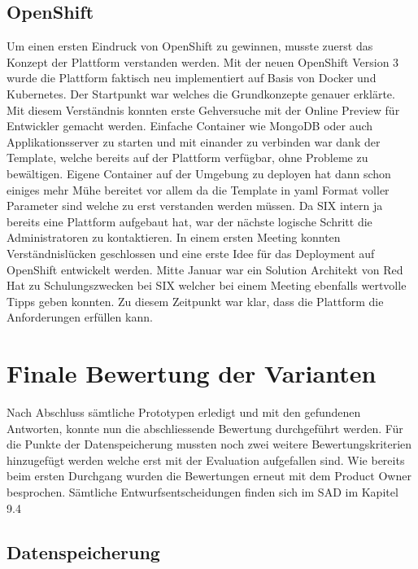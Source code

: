 \subsection{OpenShift}

Um einen ersten Eindruck von OpenShift zu gewinnen, musste zuerst das Konzept der Plattform verstanden werden. Mit der neuen OpenShift Version 3 wurde die Plattform faktisch neu implementiert auf Basis von Docker und Kubernetes. Der Startpunkt war \cite{openshiftintro} welches die Grundkonzepte genauer erklärte. Mit diesem Verständnis konnten erste Gehversuche mit der Online Preview für Entwickler gemacht werden. Einfache Container wie MongoDB oder auch Applikationsserver zu starten und mit einander zu verbinden war dank der Template, welche bereits auf der Plattform verfügbar, ohne Probleme zu bewältigen. Eigene Container auf der Umgebung zu deployen hat dann schon einiges mehr Mühe bereitet vor allem da die Template in yaml Format voller Parameter sind welche zu erst verstanden werden müssen. Da SIX intern ja bereits eine Plattform aufgebaut hat, war der nächste logische Schritt die Administratoren zu kontaktieren. In einem ersten Meeting konnten Verständnislücken geschlossen und eine erste Idee für das Deployment auf OpenShift entwickelt werden. Mitte Januar war ein Solution Architekt von Red Hat zu Schulungszwecken bei SIX welcher bei einem Meeting ebenfalls wertvolle Tipps geben konnten. Zu diesem Zeitpunkt war klar, dass die Plattform die Anforderungen erfüllen kann.
\newpage

\section{Finale Bewertung der Varianten}

Nach Abschluss sämtliche Prototypen erledigt und mit den gefundenen Antworten, konnte nun die abschliessende Bewertung durchgeführt werden. Für die Punkte der Datenspeicherung mussten noch zwei weitere Bewertungskriterien hinzugefügt werden welche erst mit der Evaluation aufgefallen sind. Wie bereits beim ersten Durchgang wurden die Bewertungen erneut mit dem Product Owner besprochen. Sämtliche Entwurfsentscheidungen finden sich im SAD im Kapitel 9.4

\subsection{Datenspeicherung}

